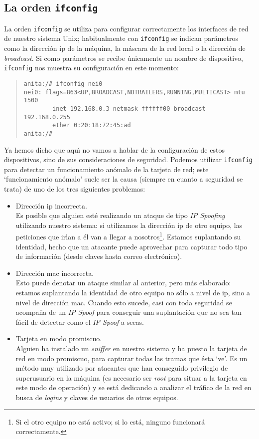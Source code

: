 \subsection{La orden {\tt ifconfig}}
La orden {\tt ifconfig} se utiliza para configurar correctamente los interfaces 
de red de nuestro sistema Unix; habitualmente con {\tt ifconfig} se indican 
par\'ametros como la direcci\'on {\sc ip} de la m\'aquina, la m\'ascara de la 
red local o la direcci\'on de {\it broadcast}. Si como par\'ametros se recibe
\'unicamente un nombre de dispositivo, {\tt ifconfig} nos muestra su
configuraci\'on en este momento:
\tt
\begin{quote}
\begin{verbatim}
anita:/# ifconfig nei0
nei0: flags=863<UP,BROADCAST,NOTRAILERS,RUNNING,MULTICAST> mtu 1500
        inet 192.168.0.3 netmask ffffff00 broadcast 192.168.0.255
        ether 0:20:18:72:45:ad 
anita:/# 
\end{verbatim}
\end{quote}
\rm
Ya hemos dicho que aqu\'{\i} no vamos a hablar de la configuraci\'on de estos
dispositivos, sino de sus consideraciones de seguridad. Podemos utilizar 
{\tt ifconfig} para detectar un funcionamiento an\'omalo de la tarjeta de
red; este `funcionamiento an\'omalo' suele ser la causa (siempre en cuanto a
seguridad se trata) de uno de los tres siguientes problemas:
\begin{itemize}
\item Direcci\'on {\sc ip} incorrecta.\\
Es posible que alguien est\'e realizando un ataque de tipo {\it IP Spoofing}
utilizando nuestro sistema: si utilizamos la direcci\'on {\sc ip} de otro 
equipo, las peticiones que ir\'{\i}an a \'el van a llegar a nosotros\footnote{Si
el otro equipo no est\'a activo; si lo est\'a, ninguno funcionar\'a 
correctamente.}. Estamos suplantando su identidad, hecho que un atacante puede
aprovechar para capturar todo tipo de informaci\'on (desde claves hasta 
correo electr\'onico).
\item Direcci\'on {\sc mac} incorrecta.\\
Esto puede denotar un ataque similar al anterior, pero m\'as elaborado: estamos
suplantando la identidad de otro equipo no s\'olo a nivel de {\sc ip}, sino a
nivel de direcci\'on {\sc mac}. Cuando esto sucede, casi con toda seguridad
se acompa\~na de un {\it IP Spoof} para conseguir una suplantaci\'on que no sea
tan f\'acil de detectar como el {\it IP Spoof} a secas.
\item Tarjeta en modo promiscuo.\\
Alguien ha instalado un {\it sniffer} en nuestro sistema y ha puesto la
tarjeta de red en modo promiscuo, para capturar todas las tramas que \'esta
`ve'. Es un m\'etodo muy utilizado por atacantes que han conseguido privilegio 
de superusuario en la m\'aquina (es necesario ser {\it root} para situar a la
tarjeta en este modo de operaci\'on) y se est\'a dedicando a analizar el 
tr\'afico de la red en busca de {\it logins} y claves de usuarios de otros
equipos.
\end{itemize}
